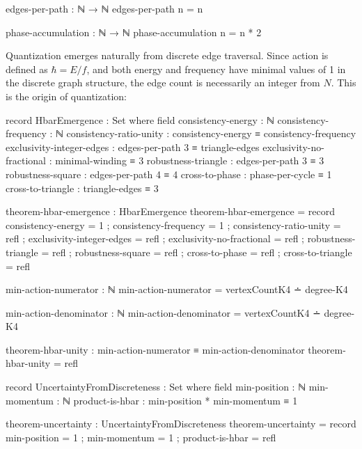 \documentclass[11pt,a4paper]{book}
\def\mathbb#1{#1}%
\begin{document}
\begin{code}
edges-per-path : ℕ → ℕ
edges-per-path n = n

phase-accumulation : ℕ → ℕ
phase-accumulation n = n * 2
\end{code}

Quantization emerges naturally from discrete edge traversal. Since action is defined 
as $\hbar = E/f$, and both energy and frequency have minimal values of 1 in the discrete 
graph structure, the edge count is necessarily an integer from $\mathbb{N}$. This is the 
origin of quantization:

\begin{code}
record HbarEmergence : Set where
  field
    consistency-energy    : ℕ
    consistency-frequency : ℕ
    consistency-ratio-unity : consistency-energy ≡ consistency-frequency
    exclusivity-integer-edges : edges-per-path 3 ≡ triangle-edges
    exclusivity-no-fractional : minimal-winding ≡ 3
    robustness-triangle : edges-per-path 3 ≡ 3
    robustness-square : edges-per-path 4 ≡ 4
    cross-to-phase : phase-per-cycle ≡ 1
    cross-to-triangle : triangle-edges ≡ 3

theorem-hbar-emergence : HbarEmergence
theorem-hbar-emergence = record
  { consistency-energy = 1
  ; consistency-frequency = 1
  ; consistency-ratio-unity = refl
  ; exclusivity-integer-edges = refl
  ; exclusivity-no-fractional = refl
  ; robustness-triangle = refl
  ; robustness-square = refl
  ; cross-to-phase = refl
  ; cross-to-triangle = refl
  }

min-action-numerator : ℕ
min-action-numerator = vertexCountK4 ∸ degree-K4

min-action-denominator : ℕ  
min-action-denominator = vertexCountK4 ∸ degree-K4

theorem-hbar-unity : min-action-numerator ≡ min-action-denominator
theorem-hbar-unity = refl
\end{code}

\begin{code}
record UncertaintyFromDiscreteness : Set where
  field
    min-position : ℕ
    min-momentum : ℕ
    product-is-hbar : min-position * min-momentum ≡ 1

theorem-uncertainty : UncertaintyFromDiscreteness
theorem-uncertainty = record
  { min-position = 1
  ; min-momentum = 1
  ; product-is-hbar = refl
  }
\end{code}
\end{document}
